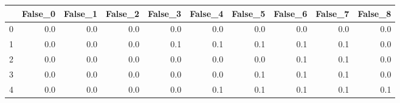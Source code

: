 \begin{tabular}{lrrrrrrrrr}
\toprule
{} &  False\_0 &  False\_1 &  False\_2 &  False\_3 &  False\_4 &  False\_5 &  False\_6 &  False\_7 &  False\_8 \\ \hline
\midrule
0 &      0.0 &      0.0 &      0.0 &      0.0 &      0.0 &      0.0 &      0.0 &      0.0 &      0.0 \\ \hline
1 &      0.0 &      0.0 &      0.0 &      0.1 &      0.1 &      0.1 &      0.1 &      0.1 &      0.0 \\ \hline
2 &      0.0 &      0.0 &      0.0 &      0.0 &      0.0 &      0.0 &      0.1 &      0.1 &      0.0 \\ \hline
3 &      0.0 &      0.0 &      0.0 &      0.0 &      0.0 &      0.1 &      0.1 &      0.1 &      0.0 \\ \hline
4 &      0.0 &      0.0 &      0.0 &      0.0 &      0.1 &      0.1 &      0.1 &      0.1 &      0.1 \\ \hline
\bottomrule
\end{tabular}
